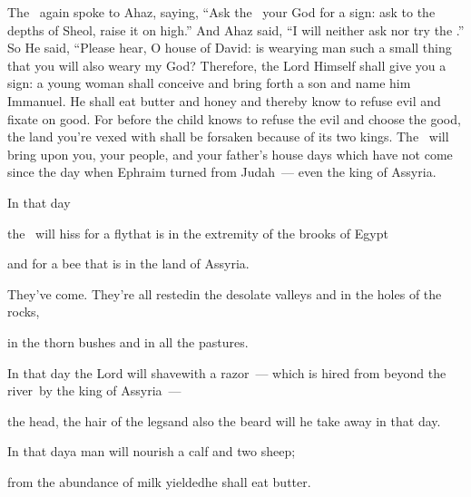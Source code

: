 \begin{inparaenum}
   The \lord\ again spoke to Ahaz, saying,%
   ``Ask the \lord\ your God for a sign: ask to the depths of Sheol, raise it on high.''%
   And Ahaz said, ``I will neither ask nor try the \lord.''%
   So He said, ``Please hear, O house of David: is wearying man such a small thing that you will also weary my God?%
   Therefore, the Lord Himself shall give you a sign: a young woman shall conceive and bring forth a son and name him Immanuel.%
   He shall eat butter and honey and thereby know to refuse evil and fixate on good.%
   For before the child knows to refuse the evil and choose the good, the land you're vexed with shall be forsaken because of its two kings.%
   The \lord\ will bring upon you, your people, and your father's house days which have not come since the day when Ephraim turned from Judah~--- even the king of Assyria.\smallskip%
  
  \pa {} In that day%
  
  \pb the \lord\ will hiss for a fly\pa that is in the extremity of the brooks of Egypt%
  
  \pb and for a bee that is in the land of Assyria.%
  
  \pa {} They've come. They're all rested\pa in the desolate valleys and in the holes of the rocks,%
  
  \pb in the thorn bushes and in all the pastures.%
  
  \pa {} In that day the Lord will shave\pa with a razor~--- which is hired from beyond the river\footnotemark\ by the king of Assyria~---%
  
  \pb the head, the hair of the legs\footnotemark\pa and also the beard will he take away in that day.%
  
  \pa {} In that day\pa a man will nourish a calf and two sheep;%
  
  \pa {} from the abundance of milk yielded\pa he shall eat butter.%
  

\end{inparaenum}
